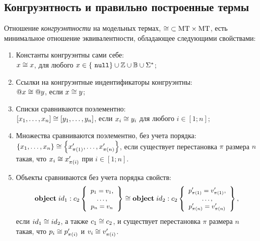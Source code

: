 \subsection{Конгруэнтность и правильно построенные термы}

\begin{Def}
Отношение \emph{конгруэнтности} на модельных термах, \mbox{$\cong \;\subset \mbox{MT} \times \mbox{MT}$}, есть минимальное отношение эквивалентности, обладающее следующими свойствами:
\begin{enumerate}
\item Константы конгруэнтны сами себе:\\
 \mbox{$x \cong x$}, для любого $x \in \left\{\ \mathtt{null} \right\} \cup \mathbb{Z} \cup \mathbb{B} \cup \Sigma^*$;
\item Ссылки на конгруэнтные индентификаторы конгруэнтны: \\
$@x \cong @y$, если $x \cong y$;
\item Списки сравниваются поэлементно: \\
$\left[x_1, \ldots, x_n\right] \cong \left[y_1, \ldots, y_n\right]$, если $x_i \cong y_i$ для любого $i \in [1; n]$;
\item Множества сравниваются поэлементно, без учета порядка:\\
 $\left\{x_1, \ldots, x_n\right\} \cong \left\{x'_{\pi(1)}, \ldots, x'_{\pi(n)}\right\}$, если существует перестановка $\pi$ размера $n$ такая, что \mbox{$x_i \cong x'_{\pi(i)}$} при \mbox{$i \in [1;n]$}.
\item Объекты сравниваются без учета порядка свойств:
$$ 
\mathbf{object}\;id_1 : c_2\left\{ 
	\mbox{\small$\begin{array}{c}
		p_1=v_1,\\ 
		\ldots,\\ 
		p_n=v_n
	\end{array}$}
 \right\} \cong \mathbf{object}\;id_2 : c_2\left\{ 
	\mbox{\small$\begin{array}{c}
		p'_{\pi(1)}=v'_{\pi(1)},\\
		\ldots,\\
		p'_{\pi(n)}=v'_{\pi(n)}	
	\end{array}$}
 \right\},
$$
если $id_1 \cong id_2$, а также $c_1 \cong c_2$, и существует перестановка $\pi$ размера $n$ такая, что $p_i \cong p'_{\pi(i)}$ и $v_i \cong v'_{\pi(i)}$.
\end{enumerate}
\end{Def}

